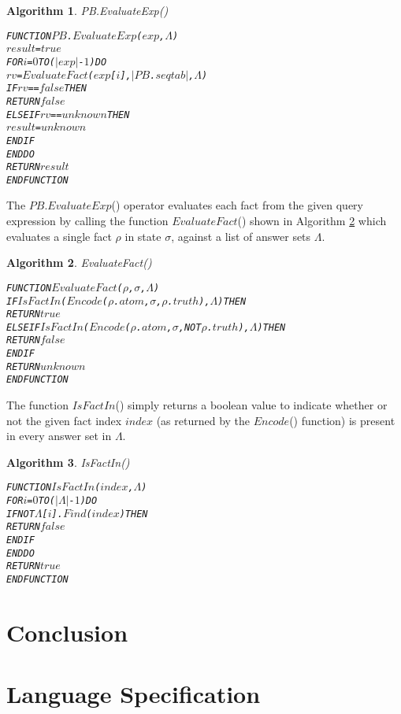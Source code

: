 \documentclass[11pt]{report}
\newenvironment{vverbatim}
{
  \begin{alltt}
}
{
    \vspace{-\baselineskip}
  \end{alltt}
}
\newtheorem{vvalgorithm}{Algorithm}[chapter]
\newenvironment{valgorithm}[2]
{
  \begin{vvalgorithm}{#1}
    \label{#2}
    \small
    \begin{vverbatim}
}
{
    \end{vverbatim}
  \end{vvalgorithm}
}
\begin{document}
        \begin{valgorithm}{PB.EvaluateExp()}{algo-impln-evale}
FUNCTION \(PB\).\(EvaluateExp\)(\(exp\), \(\Lambda\))
  \(result\) = \(true\)
  FOR \(i\) = \(0\) TO (\(|exp|\) - \(1\)) DO
    \(rv\) = \(EvaluateFact\)(\(exp\)[\(i\)], \(|\)\(PB\).\(seqtab\)\(|\), \(\Lambda\))
    IF \(rv\) == \(false\) THEN
      RETURN \(false\)
    ELSE IF \(rv\) == \(unknown\) THEN
      \(result\) = \(unknown\)
    ENDIF
  ENDDO
  RETURN \(result\)
ENDFUNCTION
        \end{valgorithm}

        The $PB$.$EvaluateExp$() operator evaluates each fact from the given
        query expression by calling the function $EvaluateFact$() shown in
        Algorithm \ref{algo-impln-evalf} which evaluates a single fact $\rho$
        in state $\sigma$, against a list of answer sets $\Lambda$.

        \begin{valgorithm}{EvaluateFact()}{algo-impln-evalf}
FUNCTION \(EvaluateFact\)(\(\rho\), \(\sigma\), \(\Lambda\))
  IF \(IsFactIn\)(\(Encode\)(\(\rho\).\(atom\), \(\sigma\), \(\rho\).\(truth\)), \(\Lambda\)) THEN
    RETURN \(true\)
  ELSE IF \(IsFactIn\)(\(Encode\)(\(\rho\).\(atom\), \(\sigma\), NOT \(\rho\).\(truth\)), \(\Lambda\)) THEN
    RETURN \(false\)
  ENDIF
  RETURN \(unknown\)
ENDFUNCTION
        \end{valgorithm}

        The function $IsFactIn$() simply returns a boolean value to
        indicate whether or not the given fact index $index$ (as returned
        by the $Encode$() function) is present in every answer set in
        $\Lambda$.

        \begin{valgorithm}{IsFactIn()}{algo-impln-isinf}
FUNCTION \(IsFactIn\)(\(index\), \(\Lambda\))
  FOR \(i\) = \(0\) TO (\(|\Lambda|\) - \(1\)) DO
    IF NOT \(\Lambda\)[\(i\)].\(Find\)(\(index\)) THEN
      RETURN \(false\)
    ENDIF
  ENDDO
  RETURN \(true\)
ENDFUNCTION
        \end{valgorithm}

  \chapter{Conclusion}
    \label{chap-concl}

  \appendix

  \chapter{Language Specification}
    \label{chap-langs}
\end{document}
